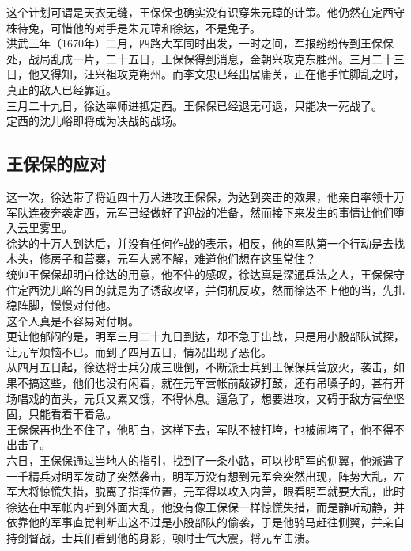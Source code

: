 \begin{multicols}{\theparacolNo}
这个计划可谓是天衣无缝，王保保也确实没有识穿朱元璋的计策。他仍然在定西守株待兔，可惜他的对手是朱元璋和徐达，不是兔子。\\

洪武三年（1670年）二月，四路大军同时出发，一时之间，军报纷纷传到王保保处，战局乱成一片，二十五日，王保保得到消息，金朝兴攻克东胜州。三月二十三日，他又得知，汪兴祖攻克朔州。而李文忠已经出居庸关，正在他手忙脚乱之时，真正的敌人已经靠近。\\

三月二十九日，徐达率师进抵定西。王保保已经退无可退，只能决一死战了。\\

定西的沈儿峪即将成为决战的战场。\\

\subsection{王保保的应对}
这一次，徐达带了将近四十万人进攻王保保，为达到突击的效果，他亲自率领十万军队连夜奔袭定西，元军已经做好了迎战的准备，然而接下来发生的事情让他们堕入云里雾里。\\

徐达的十万人到达后，并没有任何作战的表示，相反，他的军队第一个行动是去找木头，修房子和营寨，元军大惑不解，难道他们想在这里常住？\\

统帅王保保却明白徐达的用意，他不住的感叹，徐达真是深通兵法之人，王保保守住定西沈儿峪的目的就是为了诱敌攻坚，并伺机反攻，然而徐达不上他的当，先扎稳阵脚，慢慢对付他。\\

这个人真是不容易对付啊。\\

更让他郁闷的是，明军三月二十九日到达，却不急于出战，只是用小股部队试探，让元军烦恼不已。而到了四月五日，情况出现了恶化。\\

从四月五日起，徐达将士兵分成三班倒，不断派士兵到王保保兵营放火，袭击，如果不搞这些，他们也没有闲着，就在元军营帐前敲锣打鼓，还有吊嗓子的，甚有开场唱戏的苗头，元兵又累又饿，不得休息。逼急了，想要进攻，又碍于敌方营垒坚固，只能看着干着急。\\

王保保再也坐不住了，他明白，这样下去，军队不被打垮，也被闹垮了，他不得不出击了。\\

六日，王保保通过当地人的指引，找到了一条小路，可以抄明军的侧翼，他派遣了一千精兵对明军发动了突然袭击，明军万没有想到元军会突然出现，阵势大乱，左军大将惊慌失措，脱离了指挥位置，元军得以攻入内营，眼看明军就要大乱，此时徐达在中军帐内听到外面大乱，他没有像王保保一样惊慌失措，而是静听动静，并依靠他的军事直觉判断出这不过是小股部队的偷袭，于是他骑马赶往侧翼，并亲自持剑督战，士兵们看到他的身影，顿时士气大震，将元军击溃。\\


\end{multicols}
